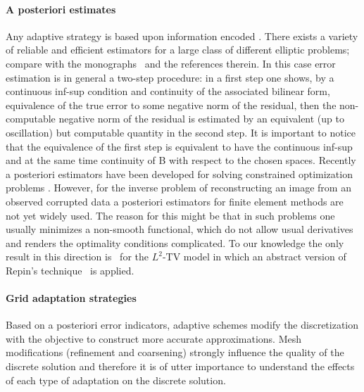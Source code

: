 \documentclass[enabledeprecatedfontcommands,cleardoublepage=empty,headsepline,twoside,11pt,DIV=15,BCOR=12mm,final]{scrartcl}
\newcommand{\newf}[1]{}%
\begin{document}
\paragraph{A posteriori estimates}
Any adaptive strategy is based upon information encoded \newf{in local  estimators of the error notion at hand}. There exists a variety of reliable and efficient estimators for a large class of different elliptic problems; compare with the monographs~\cite{AinOde,Ciarlet:02,Verfurth:96} and the references therein. In this case error estimation is in general a two-step procedure: in a first step one shows, by a continuous inf-sup condition and continuity of the associated bilinear form, equivalence of the true error to some negative norm of the residual, then the non-computable negative norm of the residual is estimated by an equivalent (up to oscillation) but computable quantity in the second step. It is important to notice that the equivalence of the first step is equivalent to have the continuous inf-sup and at the same time continuity of B with respect to the chosen spaces. Recently a posteriori estimators have been developed  for solving constrained optimization problems \cite{KoRoSi:14}. However, for the inverse problem of reconstructing an image from an observed corrupted data a posteriori estimators for finite element methods are not yet widely used. The reason for this might be that in such problems one usually minimizes a non-smooth functional, which do not allow usual derivatives and renders the optimality conditions complicated. To our knowledge the only result in this direction is~\cite{Bar2015} for the $L^2$-TV model 
in which an abstract version of Repin's technique~\cite{Repin} is applied.



\paragraph{Grid adaptation strategies}
Based on a posteriori error indicators, adaptive schemes modify the discretization with the objective to construct more accurate approximations. Mesh modifications (refinement and coarsening) strongly influence the quality of the discrete solution and therefore it is of utter importance to understand the effects of each type of adaptation on the discrete solution.
\end{document}
